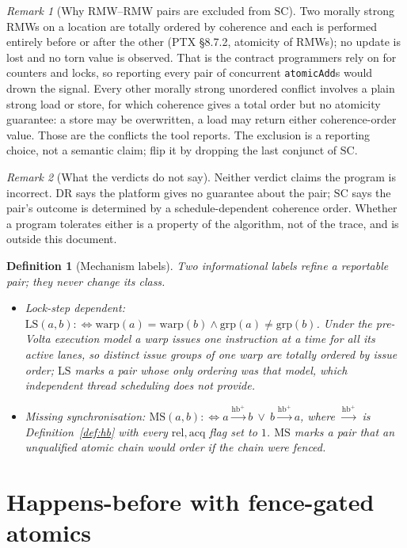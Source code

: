 \documentclass[11pt]{article}
\newtheorem{definition}{Definition}
\theoremstyle{remark}
\newtheorem{remark}{Remark}
\newcommand{\HBu}{\xrightarrow{\mathrm{hb}^{+}}}
\newcommand{\warp}{\mathrm{warp}}
\newcommand{\grp}{\mathrm{grp}}
\newcommand{\rel}{\mathrm{rel}}
\newcommand{\acq}{\mathrm{acq}}
\newcommand{\DR}{\mathrm{DR}}
\newcommand{\SC}{\mathrm{SC}}
\newcommand{\LS}{\mathrm{LS}}
\newcommand{\MS}{\mathrm{MS}}
\begin{document}
\begin{remark}[Why RMW--RMW pairs are excluded from $\SC$]
Two morally strong RMWs on a location are totally ordered by coherence and
each is performed entirely before or after the other (PTX \S8.7.2, atomicity
of RMWs); no update is lost and no torn value is observed. That is the
contract programmers rely on for counters and locks, so reporting every pair of
concurrent \texttt{atomicAdd}s would drown the signal. Every other morally
strong unordered conflict involves a plain strong load or store, for which
coherence gives a total order but no atomicity guarantee: a store may be
overwritten, a load may return either coherence-order value. Those are the
conflicts the tool reports. The exclusion is a reporting choice, not a
semantic claim; flip it by dropping the last conjunct of $\SC$.
\end{remark}

\begin{remark}[What the verdicts do not say]
Neither verdict claims the program is incorrect. $\DR$ says the platform gives
no guarantee about the pair; $\SC$ says the pair's outcome is determined by a
schedule-dependent coherence order. Whether a program tolerates either is a
property of the algorithm, not of the trace, and is outside this document.
\end{remark}

\begin{definition}[Mechanism labels]\label{def:labels2}
Two informational labels refine a reportable pair; they never change its class.
\begin{itemize}[nosep]
\item \emph{Lock-step dependent}:
      $\LS(a,b):\Leftrightarrow \warp(a)=\warp(b)\wedge\grp(a)\ne\grp(b)$.
      Under the pre-Volta execution model a warp issues one instruction at a
      time for all its active lanes, so distinct issue groups of one warp are
      totally ordered by issue order; $\LS$ marks a pair whose only ordering
      was that model, which independent thread scheduling does not provide.
\item \emph{Missing synchronisation}:
      $\MS(a,b):\Leftrightarrow a\HBu b\ \vee\ b\HBu a$, where $\HBu$ is
      Definition~\ref{def:hb} with every $\rel,\acq$ flag set to $1$. $\MS$
      marks a pair that an unqualified atomic chain would order if the chain
      were fenced.
\end{itemize}
\end{definition}

\section{Happens-before with fence-gated atomics}
\end{document}
